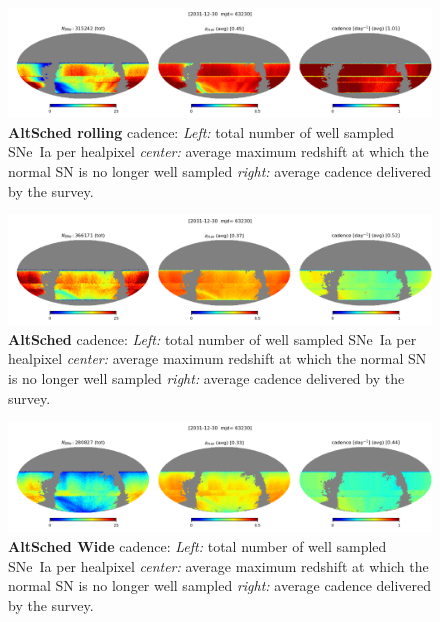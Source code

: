 

\begin{figure}[h!]
  \begin{center}
    \includegraphics[width=\linewidth]{Figures/altsched_rolling_good_weather_64_maps.png}
    \caption{{\bf AltSched rolling} cadence: {\em Left:} total number
      of well sampled SNe~Ia per healpixel {\em center:} average
      maximum redshift at which the normal SN is no longer well
      sampled {\em right:} average cadence delivered by the survey.}
  \end{center}
\end{figure}


\begin{figure}[h!]
  \begin{center}
    \includegraphics[width=\linewidth]{Figures/altsched_good_weather_64_maps.png}
    \caption{{\bf AltSched} cadence: {\em Left:} total number of well
      sampled SNe~Ia per healpixel {\em center:} average maximum
      redshift at which the normal SN is no longer well sampled {\em
        right:} average cadence delivered by the survey.}
  \end{center}
\end{figure}

\begin{figure}[h!]
  \begin{center}
    \includegraphics[width=\linewidth]{Figures/altsched_18__90_40_64_maps.png}
    \caption{{\bf AltSched Wide} cadence: {\em Left:} total number of well
      sampled SNe~Ia per healpixel {\em center:} average maximum
      redshift at which the normal SN is no longer well sampled {\em
        right:} average cadence delivered by the survey.}
  \end{center}
\end{figure}

